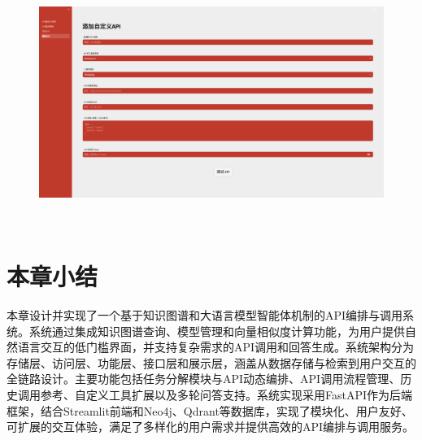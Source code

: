 \begin{figure}[H]
  \vspace{1em}
  \centering
  \setlength{\abovecaptionskip}{10pt} %
  \includegraphics[height=8cm]{../assets/ch6-添加自定义API.png}
  \label{fig:ch6-add-tool}
\end{figure}

\section{本章小结}

本章设计并实现了一个基于知识图谱和大语言模型智能体机制的API编排与调用系统。系统通过集成知识图谱查询、模型管理和向量相似度计算功能，为用户提供自然语言交互的低门槛界面，并支持复杂需求的API调用和回答生成。系统架构分为存储层、访问层、功能层、接口层和展示层，涵盖从数据存储与检索到用户交互的全链路设计。主要功能包括任务分解模块与API动态编排、API调用流程管理、历史调用参考、自定义工具扩展以及多轮问答支持。系统实现采用FastAPI作为后端框架，结合Streamlit前端和Neo4j、Qdrant等数据库，实现了模块化、用户友好、可扩展的交互体验，满足了多样化的用户需求并提供高效的API编排与调用服务。